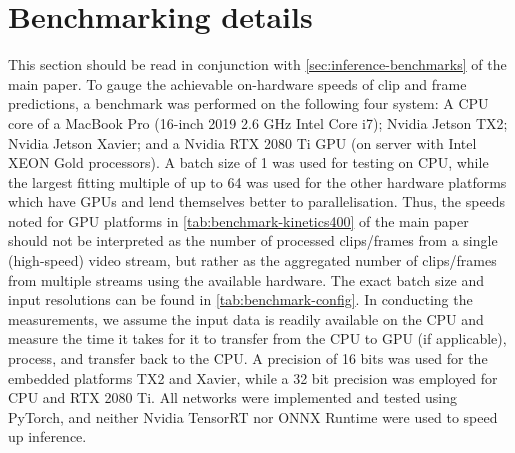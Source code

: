 \documentclass[runningheads]{llncs}
\begin{document}
\section{Benchmarking details} \label{apx:benchmark-details}
This section should be read in conjunction with \cref{sec:inference-benchmarks} of the main paper.
To gauge the achievable on-hardware speeds of clip and frame predictions, a benchmark was performed on the following four system:
A CPU core of a MacBook Pro (16-inch 2019 2.6 GHz Intel Core i7); 
Nvidia Jetson TX2;
Nvidia Jetson Xavier;
and a Nvidia RTX 2080 Ti GPU (on server with Intel XEON Gold processors).
A batch size of 1 was used for testing on CPU, while the largest fitting multiple of  up to 64 was used for the other hardware platforms which have GPUs and lend themselves better to parallelisation. 
Thus, the speeds noted for GPU platforms in \cref{tab:benchmark-kinetics400} of the main paper should not be interpreted as the number of processed clips/frames from a single (high-speed) video stream, but rather as the aggregated number of clips/frames from multiple streams using the available hardware.
The exact batch size and input resolutions can be found in \cref{tab:benchmark-config}. 
In conducting the measurements, we assume the input data is readily available on the CPU and measure the time it takes for it to transfer from the CPU to GPU (if applicable), process, and transfer back to the CPU.
A precision of 16 bits was used for the embedded platforms TX2 and Xavier, while a 32 bit precision was employed for CPU and RTX 2080 Ti. 
All networks were implemented and tested using PyTorch, and neither Nvidia TensorRT nor ONNX Runtime were used to speed up inference.
\end{document}
